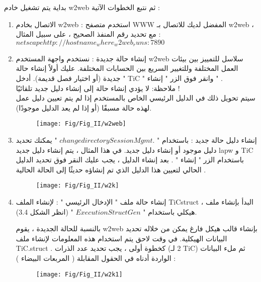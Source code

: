 بداية يتم تشغيل خادم w2web  ثم نتبع الخطوات الآتية :
\begin{enumerate}
	\item 
	الاتصال بخادم w2web : استخدم متصفح WWW المفضل لديك للاتصال بـ w2web ، مع تحديد رقم المنفذ الصحيح ، على سبيل المثال : \\
	$ netscape http://hostname_where_w2web_runs:7890 $
	
	\item 
	إنشاء حالة جديدة : نستخدم واجهة المستخدم w2web سلاسل للتمييز بين بيئات العمل المختلفة وللتغيير السريع بين الحسابات المختلفة. عليك أولاً إنشاء حالة جديدة  (أو اختيار فصل قديمة). أدخل " TiC " وانقر فوق الزر "  إنشاء " .\\
	ملاحظة: لا يؤدي إنشاء حالة إلى إنشاء دليل جديد تلقائيًا !	\\
	سيتم تحويل ذلك في الدليل الرئيسي الخاص بالمستخدم إذا لم يتم تعيين دليل عمل لهذه حالة مسبقًا (أو إذا لم يعد الدليل موجودًا).
	
	\begin{figure}[h!]
		\centering
		\texttt{[image: Fig/Fig\_II/w2web]}
		\caption{}
		\label{fig:w2web}
	\end{figure}
	\FloatBarrier
	
	\item 
	إنشاء دليل حالة جديد : باستخدام "  $ change directory Session Mgmt. $  " يمكنك تحديد دليل موجود أو إنشاء دليل جديد. في هذا المثال ، يتم إنشاء دليل جديد lapw و TiC باستخدام الزر " إنشاء " . بعد إنشاء الدليل ، يجب عليك النقر فوق تحديد الدليل الحالي لتعيين هذا الدليل الذي تم إنشاؤه حديثًا إلى الحالة الحالية .
	
	\begin{figure}[h!]
		\centering
		\texttt{[image: Fig/Fig\_II/w2k]}
		\caption{}
		\label{fig:w2k}
	\end{figure}
	\FloatBarrier
	
	\item 
	إنشاء حالة ملف " الإدخال الرئيسي " : لإنشاء الملف TiCstruct ، البدأ بإنشاء ملف هيكلي باستخدام " $ Execution StructGen $ "   (انظر الشكل 3.4).
	
	بالنسبة للحالة الجديدة ، يقوم w2web بإنشاء قالب هيكل فارغ يمكن من خلاله تحديد البيانات الهيكلية. في وقت لاحق يتم استخدام هذه المعلومات لإنشاء ملف TiC.struct . كخطوة أولى ، يجب تحديد عدد الذرات (2 لـ TiC) ثم ملء البيانات الواردة أدناه في الحقول المقابلة ( المربعات البيضاء ) :
	
	\begin{figure}[h!]
		\centering
		\texttt{[image: Fig/Fig\_II/w2k1]}
		\caption{}
		\label{fig:w2k1}
	\end{figure}
	\FloatBarrier
	

\end{enumerate}
